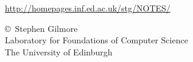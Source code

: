 \secdown
{}

\url{http://homepages.inf.ed.ac.uk/stg/NOTES/}

\bigskip\noindent
\copyright\ Stephen Gilmore\\
Laboratory for Foundations of Computer Science\\
The University of Edinburgh

\secup
